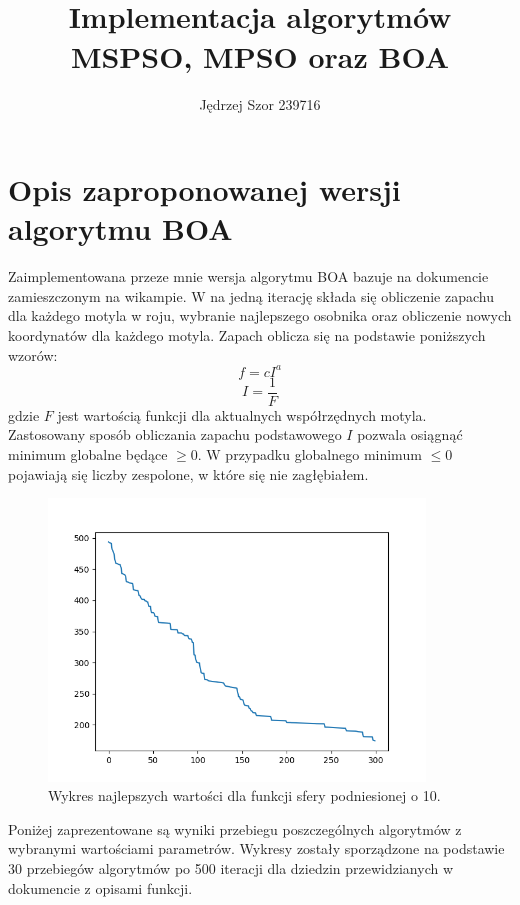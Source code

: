 \documentclass[12pt]{article}
\begin{document}
\author{Jędrzej Szor 239716}
\title{\\\textbf{Implementacja algorytmów MSPSO, MPSO oraz BOA}}
\maketitle

\section{Opis zaproponowanej wersji algorytmu BOA}
Zaimplementowana przeze mnie wersja algorytmu BOA bazuje na dokumencie zamieszczonym na wikampie. W na jedną iterację składa się obliczenie zapachu dla każdego motyla w roju, wybranie najlepszego osobnika oraz obliczenie nowych koordynatów dla każdego motyla. Zapach oblicza się na podstawie poniższych wzorów:
\begin{equation}
    f = cI^a
\end{equation}
\begin{equation}
    I = \frac{1}{F}
\end{equation}
gdzie $F$ jest wartością funkcji dla aktualnych współrzędnych motyla.\\
Zastosowany sposób obliczania zapachu podstawowego $I$ pozwala osiągnąć minimum globalne będące $\geq 0$. W przypadku globalnego minimum $\le 0$ pojawiają się liczby zespolone, w które się nie zagłębiałem.
\begin{figure}[H]
    \centering
    \includegraphics[width=10cm]{plots/BOA/1_best.png}
    \caption{Wykres najlepszych wartości dla funkcji sfery podniesionej o 10.}
\end{figure}
Poniżej zaprezentowane są wyniki przebiegu poszczególnych algorytmów z wybranymi wartościami parametrów. Wykresy zostały sporządzone na podstawie 30 przebiegów algorytmów po 500 iteracji dla dziedzin przewidzianych w dokumencie z opisami funkcji.
\end{document}
